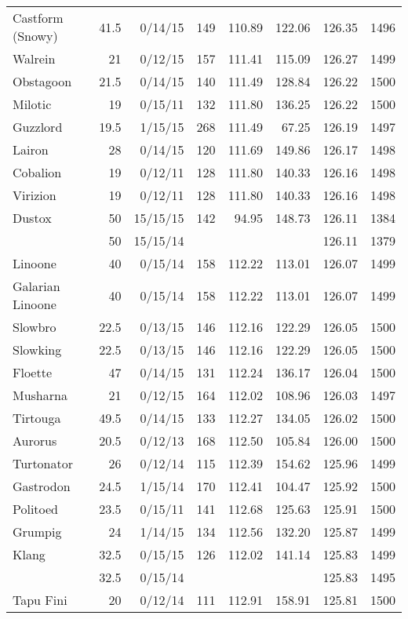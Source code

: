 \begin{longtable}{lrrrrrrr}
Castform (Snowy) & 41.5 & 0/14/15 & 149 & 110.89 & 122.06 & 126.35 & 1496\\
Walrein & 21 & 0/12/15 & 157 & 111.41 & 115.09 & 126.27 & 1499\\
Obstagoon & 21.5 & 0/14/15 & 140 & 111.49 & 128.84 & 126.22 & 1500\\
Milotic & 19 & 0/15/11 & 132 & 111.80 & 136.25 & 126.22 & 1500\\
Guzzlord & 19.5 & 1/15/15 & 268 & 111.49 & 67.25 & 126.19 & 1497\\
Lairon & 28 & 0/14/15 & 120 & 111.69 & 149.86 & 126.17 & 1498\\
Cobalion & 19 & 0/12/11 & 128 & 111.80 & 140.33 & 126.16 & 1498\\
Virizion & 19 & 0/12/11 & 128 & 111.80 & 140.33 & 126.16 & 1498\\
Dustox & 50 & 15/15/15 & 142 & 94.95 & 148.73 & 126.11 & 1384\\
 & 50 & 15/15/14 & & & & 126.11 & 1379\\
Linoone & 40 & 0/15/14 & 158 & 112.22 & 113.01 & 126.07 & 1499\\
Galarian Linoone & 40 & 0/15/14 & 158 & 112.22 & 113.01 & 126.07 & 1499\\
Slowbro & 22.5 & 0/13/15 & 146 & 112.16 & 122.29 & 126.05 & 1500\\
Slowking & 22.5 & 0/13/15 & 146 & 112.16 & 122.29 & 126.05 & 1500\\
Floette & 47 & 0/14/15 & 131 & 112.24 & 136.17 & 126.04 & 1500\\
Musharna & 21 & 0/12/15 & 164 & 112.02 & 108.96 & 126.03 & 1497\\
Tirtouga & 49.5 & 0/14/15 & 133 & 112.27 & 134.05 & 126.02 & 1500\\
Aurorus & 20.5 & 0/12/13 & 168 & 112.50 & 105.84 & 126.00 & 1500\\
Turtonator & 26 & 0/12/14 & 115 & 112.39 & 154.62 & 125.96 & 1499\\
Gastrodon & 24.5 & 1/15/14 & 170 & 112.41 & 104.47 & 125.92 & 1500\\
Politoed & 23.5 & 0/15/11 & 141 & 112.68 & 125.63 & 125.91 & 1500\\
Grumpig & 24 & 1/14/15 & 134 & 112.56 & 132.20 & 125.87 & 1499\\
Klang & 32.5 & 0/15/15 & 126 & 112.02 & 141.14 & 125.83 & 1499\\
 & 32.5 & 0/15/14 & & & & 125.83 & 1495\\
Tapu Fini & 20 & 0/12/14 & 111 & 112.91 & 158.91 & 125.81 & 1500\\

\end{longtable}
